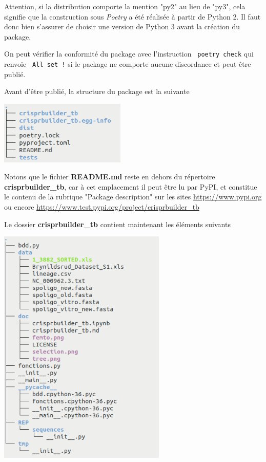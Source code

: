 \documentclass[twoside,a4paper,11pt,frenchb,openany]{report}
\begin{document}
Attention, si la distribution comporte la mention "py2" au lieu de "py3", cela signifie que la construction sous \textit{Poetry} a été réalisée à partir de Python 2. Il faut donc bien s'assurer de choisir une version de Python 3 avant la création du package.

On peut vérifier la conformité du package avec l’instruction
\texttt{ poetry check}
qui renvoie
\texttt{ All set !}
si le package ne comporte aucune discordance et peut être publié.

Avant d'être publié, la structure du package est la suivante

\includegraphics[width=6cm]{tree_level1.png}

Notons que le fichier \textbf{README.md} reste en dehors du répertoire \textbf{crisprbuilder\_tb}, car à cet emplacement il peut être lu par PyPI, et constitue le contenu de la rubrique "Package description" sur les sites \href{https://www.pypi.org}{https://www.pypi.org} ou encore \href{https://www.test.pypi.org/project/crisprbuilder\_tb}{https://www.test.pypi.org/project/crisprbuilder\_tb}

Le dossier \textbf{crisprbuilder\_tb} contient maintenant les éléments suivants

\includegraphics[width=8cm]{rep_crispr.png}
\end{document}
